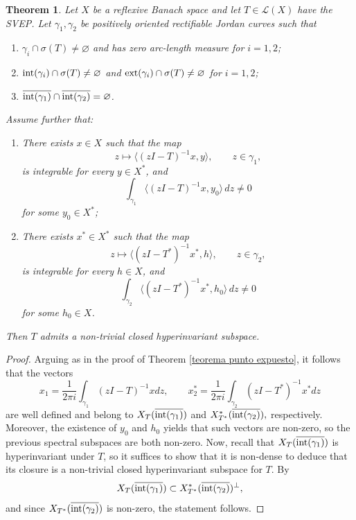 \documentclass[11pt]{amsart}
\newtheorem{theorem}{Theorem}[section]
\theoremstyle{definition}
\theoremstyle{remark}
\numberwithin{equation}{section}
\newcommand{\inte}{\textnormal{int}}
\newcommand{\exte}{\textnormal{ext}}
\begin{document}
\begin{theorem}
Let $X$ be a reflexive Banach space and let $T\in\mathcal L(X)$ have the SVEP. Let $\gamma_1,\gamma_2$ be positively oriented rectifiable Jordan curves such that
\begin{enumerate}
\item[(i)] $\gamma_i\cap\sigma(T)\neq\varnothing$ and has zero arc-length measure for $i=1,2$;
\item[(ii)] $\inte(\gamma_i)\cap\sigma(T)\neq\varnothing$ and $\exte(\gamma_i)\cap\sigma(T)\neq\varnothing$ for $i=1,2$;
\item[(iii)] $\overline{\inte(\gamma_1)}\cap\overline{\inte(\gamma_2)}=\varnothing$.
\end{enumerate}
Assume further that:
\begin{enumerate}
\item[(a)] There exists $x\in X$ such that the map
\begin{equation}\label{int1}
z\mapsto \langle (zI-T)^{-1}x,y\rangle,\qquad z\in\gamma_1,
\end{equation}
is integrable for every $y\in X^*$, and
$$
\int_{\gamma_1}\langle (zI-T)^{-1}x,y_0\rangle\,dz\neq0
$$
for some $y_0\in X^*$;

\item[(b)] There exists $x^*\in X^*$ such that the map
\begin{equation}\label{int2}
z\mapsto \langle (zI-T^*)^{-1}x^*,h\rangle,\qquad z\in\gamma_2,
\end{equation}
is integrable for every $h\in X$, and
$$
\int_{\gamma_2}\langle (zI-T^*)^{-1}x^*,h_0\rangle\,dz\neq0
$$
for some $h_0\in X$.
\end{enumerate}
Then $T$ admits a non-trivial closed hyperinvariant subspace.
\end{theorem}


\begin{proof}
Arguing as in the proof of Theorem \ref{teorema punto expuesto}, it follows that the vectors
$$x_1 = \frac{1}{2\pi i}\int_{\gamma_1} (z I-T)^{-1}x dz, \qquad x^*_2 = \frac{1}{2\pi i} \int_{\gamma_2} (z I-T^*)^{-1}x^*dz $$
are well defined and belong to $X_T(\overline{\inte(\gamma_1)})$ and $X^*_{T^*}(\overline{\inte(\gamma_2)}),$ respectively. Moreover, the existence of $y_0$ and $h_0$ yields that such vectors are non-zero, so the previous spectral subspaces are both non-zero. Now, recall that $X_T(\overline{\inte(\gamma_1)})$ is hyperinvariant under $T$, so it suffices to show that it is non-dense to deduce that its closure is a non-trivial closed hyperinvariant subspace for $T$. By \cite[Proposition 2.5.1]{LN00}
    $$X_T(\overline{\inte(\gamma_1)}) \subset X^*_{T^*}(\overline{\inte(\gamma_2)})^\perp,
    $$
    and since $X_{T^*}(\overline{\inte(\gamma_2)})$ is non-zero, the statement follows.
\end{proof}
\end{document}
